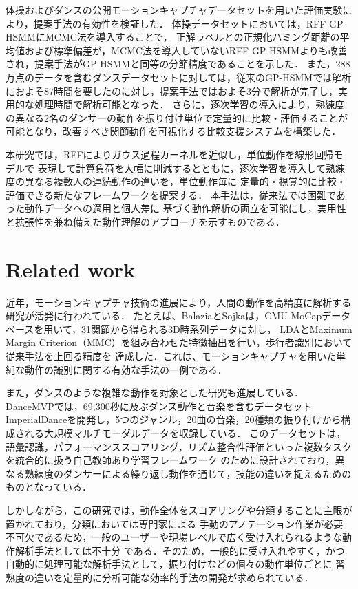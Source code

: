 \documentclass[conference]{IEEEtran}
\begin{document}
体操およびダンスの公開モーションキャプチャデータセットを用いた評価実験により，提案手法の有効性を検証した．
体操データセットにおいては，RFF-GP-HSMMにMCMC法を導入することで，
正解ラベルとの正規化ハミング距離の平均値および標準偏差が，MCMC法を導入していないRFF-GP-HSMMよりも改善され，提案手法がGP-HSMMと同等の分節精度であることを示した．
また，288万点のデータを含むダンスデータセットに対しては，従来のGP-HSMMでは解析におよそ87時間を要したのに対し，提案手法ではおよそ3分で解析が完了し，実用的な処理時間で解析可能となった．
さらに，逐次学習の導入により，熟練度の異なる2名のダンサーの動作を振り付け単位で定量的に比較・評価することが可能となり，改善すべき関節動作を可視化する比較支援システムを構築した．

本研究では，RFFによりガウス過程カーネルを近似し，単位動作を線形回帰モデルで
表現して計算負荷を大幅に削減するとともに，逐次学習を導入して熟練度の異なる複数人の連続動作の違いを，単位動作毎に
定量的・視覚的に比較・評価できる新たなフレームワークを提案する．
本手法は，従来法では困難であった動作データへの適用と個人差に
基づく動作解析の両立を可能にし，実用性と拡張性を兼ね備えた動作理解のアプローチを示すものである．

\section{Related work}
近年，モーションキャプチャ技術の進展により，人間の動作を高精度に解析する研究が活発に行われている\cite{Balazia2018, 3DPW2018, Thoker2021, Lam2023, Suo2024, DanceMVP2024}．
たとえば、BalaziaとSojka\cite{Balazia2018}は，CMU MoCapデータベースを用いて，31関節から得られる3D時系列データに対し，
LDAとMaximum Margin Criterion（MMC）を組み合わせた特徴抽出を行い，歩行者識別において従来手法を上回る精度を
達成した．これは、モーションキャプチャを用いた単純な動作の識別に関する有効な手法の一例である．

また，ダンスのような複雑な動作を対象とした研究も進展している．
DanceMVP\cite{DanceMVP2024}では，69,300秒に及ぶダンス動作と音楽を含むデータセット
ImperialDanceを開発し，5つのジャンル，20曲の音楽，20種類の振り付けから構成される大規模マルチモーダルデータを収録している．
このデータセットは，語彙認識，パフォーマンススコアリング，リズム整合性評価といった複数タスクを統合的に扱う自己教師あり学習フレームワーク
のために設計されており，異なる熟練度のダンサーによる繰り返し動作を通じて，技能の違いを捉えるためのものとなっている．

しかしながら，この研究では，動作全体をスコアリングや分類することに主眼が置かれており，分類においては専門家による
手動のアノテーション作業が必要不可欠であるため，一般のユーザーや現場レベルで広く受け入れられるような動作解析手法としては不十分
である．そのため，一般的に受け入れやすく，かつ自動的に処理可能な解析手法として，振り付けなどの個々の動作単位ごとに
習熟度の違いを定量的に分析可能な効率的手法の開発が求められている．
\end{document}
